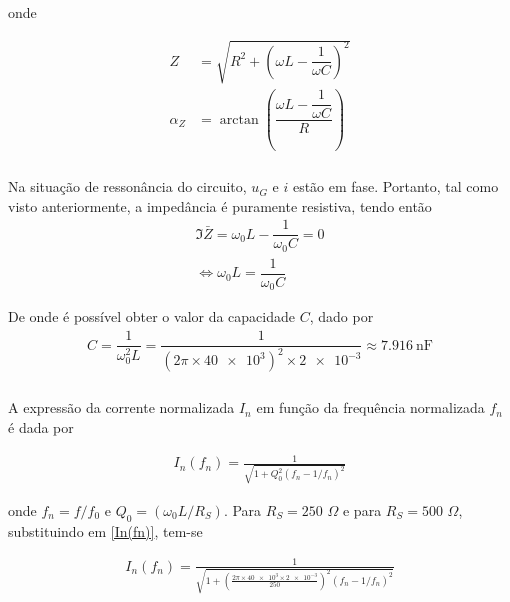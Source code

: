 \documentclass[a4paper, titlepage, portuguese]{article}
\newcommand{\eq}{\Leftrightarrow} %
\begin{document}
		onde

		\begin{align}
			Z &= \sqrt{R^2 + \left(\omega L - \dfrac{1}{\omega C}\right)^2} \\
			\alpha_Z &= \arctan{\left(\dfrac{\omega L - \dfrac{1}{\omega C}}{R}\right)}
		\end{align}

	\newpage
	\subsubsection{}
		\par
		Na situação de ressonância do circuito, $u_G$ e $i$ estão em fase.  Portanto, tal como visto anteriormente, a impedância é puramente resistiva, tendo então
		\begin{gather*}
			\Im{\bar{Z}} = \omega_0 L - \dfrac{1}{\omega_0 C} = 0 \\
			\eq \omega_0 L = \dfrac{1}{\omega_0 C}
		\end{gather*}
		\par
		De onde é possível obter o valor da capacidade $C$, dado por
		\begin{gather*}
			C = \dfrac{1}{\omega_0^2 L} = \dfrac{1}{\left(2\pi \times \num{40e3}\right)^2 \times \num{2e-3}} \approx \SI{7.916}{\nano\farad}
		\end{gather*}

	\subsubsection{}
		\par
		A expressão da corrente normalizada $I_n$ em função da frequência normalizada $f_n$ é dada por

		\begin{align}
			\label{In(fn)}
			I _ { n } \left( f _ { n } \right) = \frac { 1} { \sqrt { 1+ Q _ { 0} ^ { 2} \left( f _ { n } - 1/ f _ { n } \right) ^ { 2} } }
		\end{align}

		onde $ f _ { n } = f / f _ { 0} \hspace{4pt}\text{e}\hspace{4pt}  Q _ { 0} = \left( \omega _ { 0} L / R _ { S } \right)$.
		Para $R_S = 250\hspace{4pt}\Omega$ e para $R_S = 500\hspace{4pt}\Omega$, substituindo em \ref{In(fn)}, tem-se

		\begin{align}
			\label{In_250}
			I _ { n } \left( f _ { n } \right) = \frac {1} {  \sqrt { 1+ \left(\frac{2\pi \times \num{40e3} \times \num{2e-3}}{250} \right)^{2}  \left( f _ { n } - 1/ f _ { n } \right) ^ { 2} }}
		\end{align}
\end{document}
